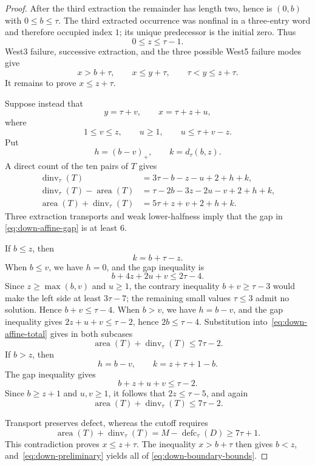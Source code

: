 \documentclass[11pt]{article}
\theoremstyle{definition}
\theoremstyle{remark}
\newcommand{\area}{\operatorname{area}}
\newcommand{\dinv}{\operatorname{dinv}}
\newcommand{\defc}{\operatorname{defc}}
\begin{document}
\begin{proof}
After the third extraction the remainder has length two, hence is
$(0,b)$ with $0\le b\le\tau$.  The third extracted occurrence was nonfinal
in a three-entry word and therefore occupied index $1$; its unique
predecessor is the initial zero.  Thus
\[
 0\le z\le\tau-1.
\]
West3 failure, successive extraction, and the three possible West5 failure
modes give
\begin{equation}
 x>b+\tau,
 \qquad x\le y+\tau,
 \qquad \tau<y\le z+\tau.
 \label{eq:down-preliminary}
\end{equation}
It remains to prove $x\le z+\tau$.

Suppose instead that
\[
 y=\tau+v,
 \qquad
 x=\tau+z+u,
\]
where
\[
 1\le v\le z,
 \qquad u\ge1,
 \qquad u\le\tau+v-z.
\]
Put
\[
 h=(b-v)_+,
 \qquad
 k=d_\tau(b,z).
\]
A direct count of the ten pairs of $T$ gives
\begin{align}
 \dinv_\tau(T)&=3\tau-b-z-u+2+h+k,
 \label{eq:down-affine-dinv}\\
 \dinv_\tau(T)-\area(T)
 &=\tau-2b-3z-2u-v+2+h+k,
 \label{eq:down-affine-gap}\\
 \area(T)+\dinv_\tau(T)
 &=5\tau+z+v+2+h+k.
 \label{eq:down-affine-total}
\end{align}
Three extraction transports and weak lower-halfness imply that the gap in
\eqref{eq:down-affine-gap} is at least $6$.

If $b\le z$, then
\[
 k=b+\tau-z.
\]
When $b\le v$, we have $h=0$, and the gap inequality is
\[
 b+4z+2u+v\le2\tau-4.
\]
Since $z\ge\max(b,v)$ and $u\ge1$, the contrary inequality
$b+v\ge\tau-3$ would make the left side at least $3\tau-7$; the remaining
small values $\tau\le3$ admit no solution.  Hence $b+v\le\tau-4$.
When $b>v$, we have $h=b-v$, and the gap inequality gives
$2z+u+v\le\tau-2$, hence
$2b\le\tau-4$.  Substitution into~\eqref{eq:down-affine-total} gives in
both subcases
\[
 \area(T)+\dinv_\tau(T)\le7\tau-2.
\]
If $b>z$, then
\[
 h=b-v,
 \qquad
 k=z+\tau+1-b.
\]
The gap inequality gives
\[
 b+z+u+v\le\tau-2.
\]
Since $b\ge z+1$ and $u,v\ge1$, it follows that
$2z\le\tau-5$, and again
\[
 \area(T)+\dinv_\tau(T)\le7\tau-2.
\]

Transport preserves defect, whereas the cutoff requires
\[
 \area(T)+\dinv_\tau(T)=M-\defc_\tau(D)\ge7\tau+1.
\]
This contradiction proves $x\le z+\tau$.  The inequality
$x>b+\tau$ then gives $b<z$, and~\eqref{eq:down-preliminary} yields all of
\eqref{eq:down-boundary-bounds}.


\end{proof}
\end{document}
